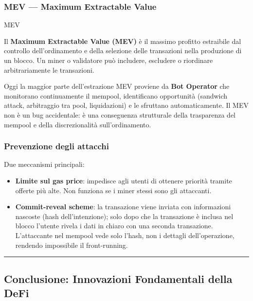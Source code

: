 \documentclass[
  italian,
  openany]{book}
\providecommand{\tightlist}{%
  \setlength{\itemsep}{0pt}\setlength{\parskip}{0pt}}
\begin{document}
\subsubsection{MEV --- Maximum Extractable
Value}\label{mev-maximum-extractable-value}

\begin{calloutdefinition}{MEV}

Il \textbf{Maximum Extractable Value (MEV)} è il massimo profitto
estraibile dal controllo dell'ordinamento e della selezione delle
transazioni nella produzione di un blocco. Un miner o validatore può
includere, escludere o riordinare arbitrariamente le transazioni.

\end{calloutdefinition}

Oggi la maggior parte dell'estrazione MEV proviene da \textbf{Bot
Operator} che monitorano continuamente il mempool, identificano
opportunità (sandwich attack, arbitraggio tra pool, liquidazioni) e le
sfruttano automaticamente. Il MEV non è un bug accidentale: è una
conseguenza strutturale della trasparenza del mempool e della
discrezionalità sull'ordinamento.

\subsubsection{Prevenzione degli
attacchi}\label{prevenzione-degli-attacchi}

Due meccanismi principali:

\begin{itemize}
\tightlist
\item
  \textbf{Limite sul gas price}: impedisce agli utenti di ottenere
  priorità tramite offerte più alte. Non funziona se i miner stessi sono
  gli attaccanti.
\item
  \textbf{Commit-reveal scheme}: la transazione viene inviata con
  informazioni nascoste (hash dell'intenzione); solo dopo che la
  transazione è inclusa nel blocco l'utente rivela i dati in chiaro con
  una seconda transazione. L'attaccante nel mempool vede solo l'hash,
  non i dettagli dell'operazione, rendendo impossibile il front-running.
\end{itemize}

\begin{center}\rule{0.5\linewidth}{0.5pt}\end{center}

\subsection{Conclusione: Innovazioni Fondamentali della
DeFi}\label{conclusione-innovazioni-fondamentali-della-defi}
\end{document}
